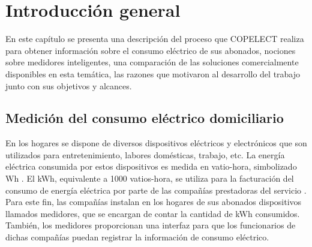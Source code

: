 
\chapter{Introducción general} %

\label{Chapter1} %
\label{IntroGeneral}


\newcommand{\keyword}[1]{\textbf{#1}}
\newcommand{\tabhead}[1]{\textbf{#1}}
\newcommand{\code}[1]{\texttt{#1}}
\newcommand{\file}[1]{\texttt{\bfseries#1}}
\newcommand{\option}[1]{\texttt{\itshape#1}}
\newcommand{\grados}{$^{\circ}$}



En este capítulo se presenta una descripción del proceso que COPELECT realiza para obtener información sobre el consumo eléctrico de sus abonados, nociones sobre medidores inteligentes, una comparación de las soluciones comercialmente disponibles en esta temática, las razones que motivaron al desarrollo del trabajo junto con sus objetivos y alcances.


\section{Medición del consumo eléctrico domiciliario}

En los hogares se dispone de diversos dispositivos eléctricos y electrónicos que son utilizados para entretenimiento, labores domésticas, trabajo, etc. La energía eléctrica consumida por estos dispositivos es medida en vatio-hora, simbolizado Wh \citep{WEBSITE:1}. El kWh, equivalente a 1000 vatios-hora, se utiliza para la facturación del consumo de energía eléctrica por parte de las compañías prestadoras del servicio \citep{WEBSITE:1}. Para este fin, las compañías instalan en los hogares de sus abonados dispositivos llamados medidores, que se encargan de contar la cantidad de kWh consumidos. También, los medidores proporcionan una interfaz para que los funcionarios de dichas compañías puedan registrar la información de consumo eléctrico.

